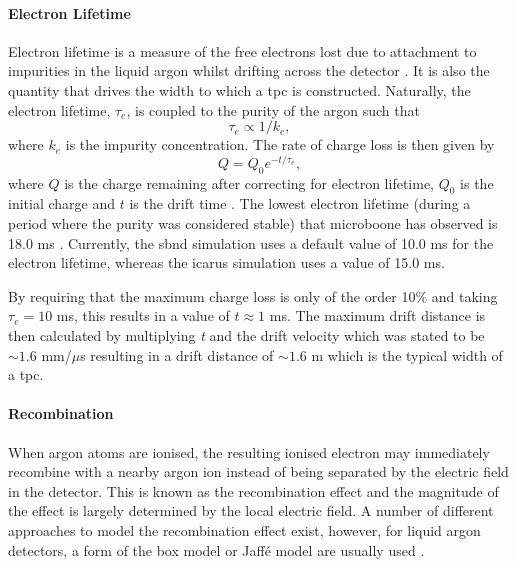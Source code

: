 \paragraph{Electron Lifetime}
 Electron lifetime is a measure of the free electrons lost due to attachment to impurities in the liquid argon whilst drifting across the detector \cite{ArgoNeuT_electron_lifetime_paper}. It is also the quantity that drives the width to which a \gls{tpc} is constructed. Naturally, the electron lifetime, $\tau_{e}$, is coupled to the purity of the argon such that
 \begin{equation}
     \tau_{e} \propto 1/k_e,
 \end{equation}
 where $k_e$ is the impurity concentration. The rate of charge loss is then given by 
 \begin{equation}
     Q = Q_{0}e^{-t/\tau_e},
 \end{equation}
where $Q$ is the charge remaining after correcting for electron lifetime, $Q_0$ is the initial charge and $t$ is the drift time \cite{ArgoNeuT_electron_lifetime_paper}. The lowest electron lifetime (during a period where the purity was considered stable) that \gls{microboone} has observed is 18.0 ms \cite{microboone_electron_lifetime}. Currently, the \gls{sbnd} simulation uses a default value of 10.0 ms for the electron lifetime, whereas the \gls{icarus} simulation uses a value of 15.0 ms.

By requiring that the maximum charge loss is only of the order 10\% and taking $\tau_e = 10$ ms, this results in a value of $t  \approx 1$ ms. The maximum drift distance is then calculated by multiplying \textit{t} and the drift velocity which was stated to be $\sim1.6$ mm/$\mu$s resulting in a drift distance of $\sim 1.6$ m which is the typical width of a \gls{tpc}.

 
\paragraph{Recombination}
When argon atoms are ionised, the resulting ionised electron may immediately recombine with a nearby argon ion instead of being separated by the electric field in the detector. This is known as the recombination effect and the magnitude of the effect is largely determined by the local electric field. A number of different approaches to model the recombination effect exist, however, for liquid argon detectors, a form of the box model or Jaff\'{e} model are usually used \cite{LArTPC_book}.

